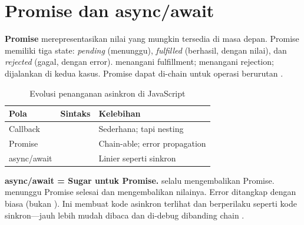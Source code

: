 ﻿\section{Promise dan async/await}

\textbf{Promise} merepresentasikan nilai yang mungkin tersedia di masa depan. Promise memiliki tiga state: \textit{pending} (menunggu), \textit{fulfilled} (berhasil, dengan nilai), dan \textit{rejected} (gagal, dengan error).  menangani fulfillment;  menangani rejection;  dijalankan di kedua kasus. Promise dapat di-chain untuk operasi berurutan \cite{jsInfo}.

\begin{table}[H]
\centering
\begin{tabular}{|P{3cm}|P{4.5cm}|P{4.5cm}|}
\hline
\textbf{Pola} & \textbf{Sintaks} & \textbf{Kelebihan} \\
\hline
Callback &  & Sederhana; tapi nesting \\
\hline
Promise &  & Chain-able; error propagation \\
\hline
async/await &  & Linier seperti sinkron \\
\hline
\end{tabular}
\caption{Evolusi penanganan asinkron di JavaScript}
\end{table}


\begin{konsep}
\textbf{async/await = Sugar untuk Promise.}  selalu mengembalikan Promise.  menunggu Promise selesai dan mengembalikan nilainya. Error ditangkap dengan  biasa (bukan ). Ini membuat kode asinkron terlihat dan berperilaku seperti kode sinkron---jauh lebih mudah dibaca dan di-debug dibanding  chain \cite{mdnJsGuide}.
\end{konsep}

